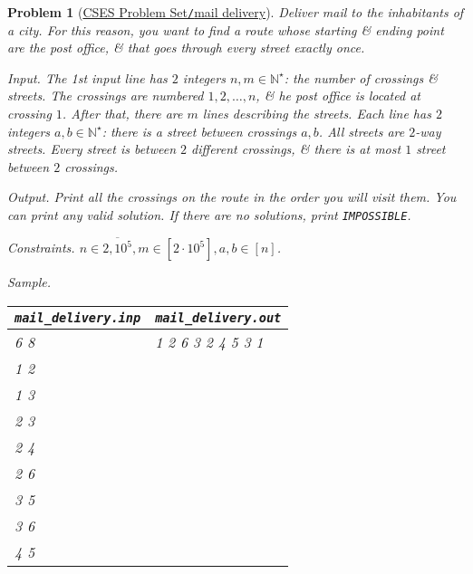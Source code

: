 \documentclass{article}
\newtheorem{problem}{Problem}
\begin{document}
\begin{problem}[\href{https://cses.fi/problemset/task/1691}{CSES Problem Set{\tt/}mail delivery}]
    Deliver mail to the inhabitants of a city. For this reason, you want to find a route whose starting \& ending point are the post office, \& that goes through every street exactly once.
    \item {\sf Input.} The 1st input line has $2$ integers $n,m\in\mathbb{N}^\star$: the number of crossings \& streets. The crossings are numbered $1,2,\ldots,n$, \& he post office is located at crossing $1$. After that, there are $m$ lines describing the streets. Each line has $2$ integers $a,b\in\mathbb{N}^\star$: there is a street between crossings $a,b$. All streets are $2$-way streets. Every street is between $2$ different crossings, \& there is at most $1$ street between $2$ crossings.
    \item {\sf Output.} Print all the crossings on the route in the order you will visit them. You can print any valid solution. If there are no solutions, print {\tt IMPOSSIBLE}.
    \item {\sf Constraints.} $n\in\overline{2,10^5},m\in[2\cdot10^5],a,b\in[n]$.
    \item {\sf Sample.}
    \begin{table}[H]
        \centering
        \begin{tabular}{|l|l|}
            \hline
            \verb|mail_delivery.inp| & \verb|mail_delivery.out| \\
            \hline
            6 8 & 1 2 6 3 2 4 5 3 1 \\
            1 2 & \\
            1 3 & \\
            2 3 & \\
            2 4 & \\
            2 6 & \\
            3 5 & \\
            3 6 & \\
            4 5 & \\
            \hline
        \end{tabular}
    \end{table}
\end{problem}
\end{document}
